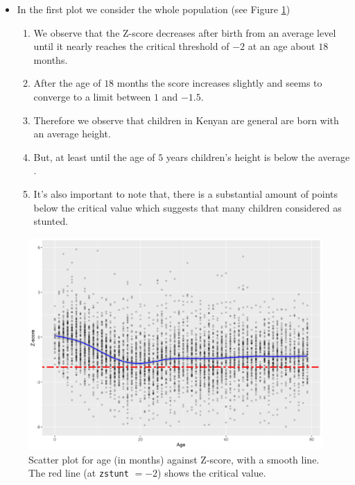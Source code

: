\begin{itemize}
    \item In the first plot we consider the whole population (see Figure \ref{fig:scatter})
    \begin{enumerate}
        \item We observe that the Z-score decreases after birth from an average level until it nearly reaches the critical threshold of $-2$ at an age about $18$ months. 
        \item After the age of $18$ months the score increases slightly and seems to converge to a limit between $1$ and $-1.5$.
        \item Therefore we observe that children in Kenyan are general are born with an average height.
        \item But, at least until the age of $5$ years children's height is below the average .
        \item It's also important to note that, there is a substantial amount of points below the critical value which suggests that many children considered as stunted.
    \end{enumerate}
\end{itemize}
\begin{figure}[h]
    \centering
		\includegraphics[scale=0.5]{ex1/scatter.png}
		\caption{Scatter plot for age (in months) against Z-score, with a smooth line. The red line (at \texttt{zstunt} $= - 2$) shows the critical value.}
		\label{fig:scatter}
\end{figure}

